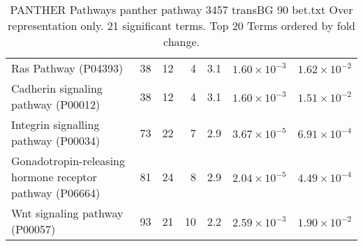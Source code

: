 \begin{table}[ht]
\begin{adjustbox}{width=\textwidth}
\begin{tabular}{lrrrrrr}
  Ras Pathway (P04393) & 38 & 12 & 4 & 3.1 & $1.60 \times 10^{-3}$ & $1.62 \times 10^{-2}$ \\ 
  Cadherin signaling pathway (P00012) & 38 & 12 & 4 & 3.1 & $1.60 \times 10^{-3}$ & $1.51 \times 10^{-2}$ \\ 
  Integrin signalling pathway (P00034) & 73 & 22 & 7 & 2.9 & $3.67 \times 10^{-5}$ & $6.91 \times 10^{-4}$ \\ 
  Gonadotropin-releasing hormone receptor pathway (P06664) & 81 & 24 & 8 & 2.9 & $2.04 \times 10^{-5}$ & $4.49 \times 10^{-4}$ \\ 
  Wnt signaling pathway (P00057) & 93 & 21 & 10 & 2.2 & $2.59 \times 10^{-3}$ & $1.90 \times 10^{-2}$ \\ 
   \hline
\end{tabular}
\end{adjustbox}
\caption{PANTHER Pathways panther pathway 3457 transBG 90 bet.txt Over representation only. 21 significant terms. Top 20 Terms ordered by fold change. } 
\label{tab:PANTHER Pathways panther pathway 3457 transBG 90 bet.txt Over representation only. 21 significant terms. Top 20 Terms ordered by fold change. }
\end{table}


